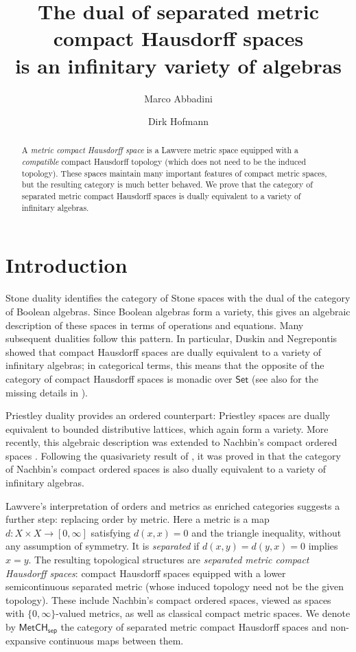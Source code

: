 \documentclass[11pt]{amsart}
\title[The dual of separated metric compact Hausdorff spaces is a variety]{The dual of separated metric compact Hausdorff spaces \\is an infinitary variety of algebras}
\author{Marco Abbadini}
\author{Dirk Hofmann}
\theoremstyle{definition}
\newcommand{\cat}[1]{\mathsf{#1}}
\newcommand{\MetCHsep}{\cat{MetCH_{sep}}}
\newcommand{\Set}{\cat{Set}}
\begin{document}
\begin{abstract}
  A \emph{metric compact Hausdorff space} is a Lawvere metric space equipped with a \emph{compatible} compact Hausdorff topology (which does not need to be the induced topology).
  These spaces maintain many important features of compact metric spaces, but the resulting category is much better behaved.
	We prove that the category of separated metric compact Hausdorff spaces is dually equivalent to a variety of infinitary algebras.
\end{abstract}

\maketitle

\tableofcontents

\section{Introduction}
\label{sec:introduction}

Stone duality \cite{Sto36} identifies the category of Stone spaces with the dual of the category of Boolean algebras. Since Boolean algebras form a variety, this gives an algebraic description of these spaces in terms of operations and equations. Many subsequent dualities follow this pattern. In particular, Duskin \cite[5.15.3]{Dus69} and Negrepontis \cite{Neg71} showed that compact Hausdorff spaces are dually equivalent to a variety of infinitary algebras; in categorical terms, this means that the opposite of the category of compact Hausdorff spaces is monadic over $\Set$ (see also \cite[Ch.~9, Cor.~1.11]{BarrWells2005} for the missing details in \cite{Dus69}).

Priestley duality \cite{Pri70,Pri72} provides an ordered counterpart: Priestley spaces are dually equivalent to bounded distributive lattices, which again form a variety. More recently, this algebraic description was extended to Nachbin's compact ordered spaces \cite{Nac65}. Following the quasivariety result of \cite{HNN18}, it was proved in \cite{Abb19,AR20} that the category of Nachbin's compact ordered spaces is also dually equivalent to a variety of infinitary algebras.

Lawvere's interpretation of orders and metrics as enriched categories \cite{Law73} suggests a further step: replacing order by metric. Here a metric is a map $d\colon X\times X\to[0,\infty]$ satisfying $d(x,x)=0$ and the triangle inequality, without any assumption of symmetry. It is \emph{separated} if $d(x,y)=d(y,x)=0$ implies $x=y$. The resulting topological structures are \emph{separated metric compact Hausdorff spaces}: compact Hausdorff spaces equipped with a lower semicontinuous separated metric (whose induced topology need not be the given topology). These include Nachbin's compact ordered spaces, viewed as spaces with $\{0,\infty\}$-valued metrics, as well as classical compact metric spaces. We denote by $\MetCHsep$ the category of separated metric compact Hausdorff spaces and non-expansive continuous maps between them.
\end{document}
